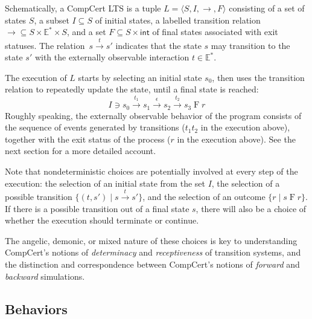\documentclass[11pt,oneside]{book}
\theoremstyle{definition}
\newcommand{\kw}[1]{\ensuremath{ \mathsf{#1} }}
\begin{document}
Schematically, a CompCert LTS
is a tuple
$L = \langle S, I, {\rightarrow}, F \rangle$
consisting of
a set of states $S$,
a subset $I \subseteq S$ of initial states,
a labelled transition relation
${\rightarrow} \subseteq S \times \mathbb{E}^* \times S$,
and a set
$F \subseteq S \times \kw{int}$
of final states associated with exit statuses.
The relation~$s \stackrel{t}{\rightarrow} s'$
indicates that the state $s$ may transition to the state $s'$
with the externally observable interaction $t \in \mathbb{E}^*$.

The execution of $L$ starts by selecting an initial state $s_0$,
then uses the transition relation to repeatedly update the state,
until a final state is reached:
\[
  I \ni s_0
  \xrightarrow{t_1} s_1
  \xrightarrow{\epsilon} s_2
  \xrightarrow{t_2} s_3
  \mathrel{F} r
\]
Roughly speaking,
the externally observable behavior of the program
consists of the sequence of events generated by transitions
($t_1 t_2$ in the execution above),
together with the exit status of the process
($r$ in the execution above).
See the next section for a more detailed account.

Note that nondeterministic choices
are potentially involved at every step of the execution:
the selection of an initial state from the set $I$,
the selection of a possible transition $\{ (t, s') \mid s \xrightarrow{t} s' \}$,
and the selection of an outcome $\{ r \mid s \mathrel{F} r \}$.
If there is a possible transition out of a final state $s$,
there will also be a choice of whether the execution should terminate
or continue.

The angelic, demonic, or mixed nature of these choices
is key to understanding CompCert's
notions of \emph{determinacy} and \emph{receptiveness}
of transition systems,
and the distinction and correspondence between
CompCert's notions of \emph{forward} and \emph{backward} simulations.


\subsection{Behaviors} %
\end{document}

